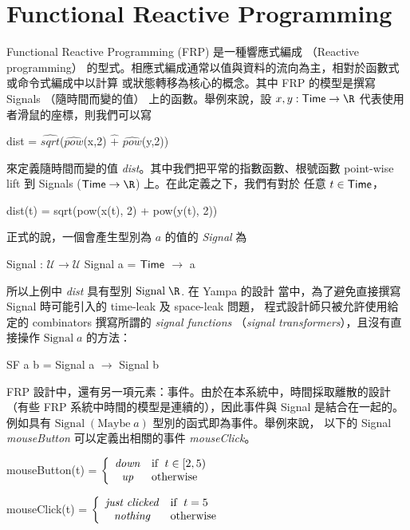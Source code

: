 \documentclass{article}
\newcommand{\U}{\mathcal{U}}
\begin{document}
\section{Functional Reactive Programming}
  Functional Reactive Programming (FRP) 是一種響應式編成
  （Reactive programming）
  的型式。相應式編成通常以值與資料的流向為主，相對於函數式或命令式編成中以計算
  或狀態轉移為核心的概念。其中 FRP 的模型是撰寫 Signals （隨時間而變的值）
  上的函數。舉例來說，設 $x,y:\Time\to\R$ 代表使用者滑鼠的座標，則我們可以寫

  \begin{code}
  dist = $\widehat{\mathit{sqrt}}$($\widehat{\mathit{pow}}$(x,2) $\widehat{+}$ $\widehat{\mathit{pow}}$(y,2))
  \end{code}

  來定義隨時間而變的值 \textit{dist}。其中我們把平常的指數函數、根號函數
  point-wise lift 到 Signals ($\Time\to\R$) 上。在此定義之下，我們有對於
  任意 $t\in\mathsf{Time}$，

  \begin{code}
  dist(t) = sqrt(pow(x(t), 2) + pow(y(t), 2))
  \end{code}

  正式的說，一個會產生型別為 $a$ 的值的 \emph{Signal} 為

  \begin{code}
  Signal : $\U\to\U$
  Signal a = $\mathsf{Time}$ $\to$ a
  \end{code}

  所以上例中 \textit{dist} 具有型別 $\text{Signal}\; \R$. 在 Yampa 的設計
  當中，為了避免直接撰寫 Signal 時可能引入的 time-leak 及 space-leak 問題，
  程式設計師只被允許使用給定的 combinators 撰寫所謂的 \emph{signal functions}
  （\emph{signal transformers}），且沒有直接操作 $\text{Signal}\; a$ 的方法：

  \begin{code}
  SF a b = Signal a $\to$ Signal b
  \end{code}

  FRP 設計中，還有另一項元素：事件。由於在本系統中，時間採取離散的設計
  （有些 FRP 系統中時間的模型是連續的），因此事件與 Signal 是結合在一起的。
  例如具有 $\text{Signal}\;(\text{Maybe}\;a)$ 型別的函式即為事件。舉例來說，
  以下的 Signal \textit{mouseButton} 可以定義出相關的事件
  \textit{mouseClick}。

  \begin{code}
  mouseButton(t) = $\displaystyle \left\{ \begin{array}{cl} \mathit{down} & \text{if\; } t\in [2,5) \\ \mathit{up} & \text{otherwise} \end{array} \right.$

  mouseClick(t) = $\displaystyle \left\{ \begin{array}{cl} \mathit{just\; clicked} & \text{if\; } t=5 \\ \mathit{nothing} & \text{otherwise} \end{array} \right.$
  \end{code}
\end{document}
